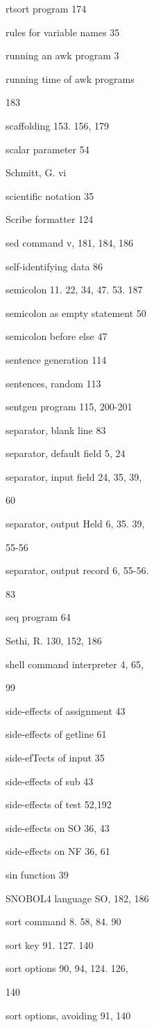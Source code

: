 \begin{multicols}{3}
rtsort program 174

rules for variable names 35

running an awk program 3

running time of awk programs

183

scaffolding 153. 156, 179

scalar parameter 54

Schmitt, G. vi

scientific notation 35

Scribe formatter 124

sed command v, 181, 184, 186

self-identifying data 86

semicolon 11. 22, 34, 47. 53. 187

semicolon as empty statement 50

semicolon before else 47

sentence generation 114

sentences, random 113

sentgen program 115, 200-201

separator, blank line 83

separator, default field 5, 24

separator, input field 24, 35, 39,

60

separator, output Held 6, 35. 39,

55-56

separator, output record 6, 55-56.

83

seq program 64

Sethi, R. 130, 152, 186

shell command interpreter 4, 65,

99

side-effects of assignment 43

side-effects of getline 61

side-efTects of input 35

side-effects of sub 43

side-effects of test 52,192

side-effects on SO 36, 43

side-effects on NF 36, 61

sin function 39

SNOBOL4 language SO, 182, 186

sort command 8. 58, 84. 90

sort key 91. 127. 140

sort options 90, 94, 124. 126,

140

sort options, avoiding 91, 140


\end{multicols}

